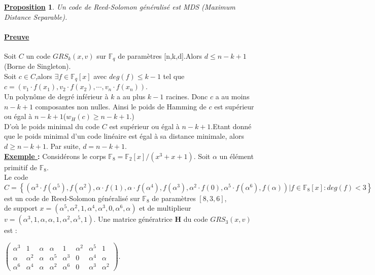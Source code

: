 \documentclass[12pt,openany]{report}
\newtheorem{proposition}{\underline{Proposition}}
\begin{document}
    \begin{proposition} Un code de Reed-Solomon généralisé est MDS (Maximum Distance Separable)\cite{Ndollane}. \end{proposition}
    \paragraph{\underline{Preuve}\\}
    Soit $\mathit{C} $ un code $GRS_k(x,v)$ sur $\mathbb{F}_q$ de paramètres [n,k,d].Alors $d\leq n-k+1$ (Borne de Singleton).\\
    Soit $c \in \mathit{C}$,alors $\exists f \in \mathbb{F}_q[x]$ avec $deg(f)\leq k-1 $ tel que $c=(v_1 \cdot f(x_1),v_2 \cdot f(x_2),\cdots,v_n \cdot f(x_n))$.\\
    Un polynôme de degré inférieur à $k$ a au plus $k-1$ racines. Donc $c$ a au moins $n-k+1$ composantes non nulles. Ainsi le poids de Hamming de $c$ est supérieur ou égal à $n-k+1$($ w_H(c)\geq n-k+1 $.)\\
    D'où le poids minimal du code $\mathit{C}$ est supérieur ou égal à $ n-k+1$.Etant donné que le poids minimal d'un code linéaire est égal à sa distance minimale, alors $ d \geq n-k+1$. Par suite,
    $ d = n-k+1$.\\
    \textbf{\underline{Exemple }:} Considérons le corps
    $\mathbb{F}_8=\mathbb{F}_2[x]/(x^3 + x+1)$. Soit $\alpha$ un élément primitif de $ \mathbb{F}_8$.\\
    Le code \\
    $\mathit{C}=\left\lbrace   \left( 
    \alpha^3 \cdot f(\alpha^5),f(\alpha^2),\alpha \cdot f(1),\alpha \cdot f(\alpha^4),f(\alpha^3),\alpha^2 \cdot f(0),\alpha^5 \cdot f(\alpha^6),f(\alpha) \right)| f \in \mathbb{F}_8[x]: deg(f)<3   \right\rbrace  $\\
    est un code de Reed-Solomon généralisé sur $\mathbb{F}_8$ de paramètres $[8,3,6] $, \\ de support $x=(\alpha^5,\alpha^2,1,\alpha^4,\alpha^3,0,\alpha^6,\alpha) $ et de multiplieur $v=(\alpha^3,1,\alpha,\alpha,1,\alpha^2,\alpha^5,1 ) $. Une matrice génératrice $\mathbf{H} $ du code $GRS_3(x,v)$ est :
    \begin{center}
    
    
    $\begin{pmatrix} 
         
         \alpha^3 &1&\alpha&\alpha&1&\alpha^2&\alpha^5&1\\
         \alpha&\alpha^2&\alpha&\alpha^5&\alpha^3&0&\alpha^4&\alpha\\
         \alpha^6&\alpha^4&\alpha&\alpha^2&\alpha^6&0&\alpha^3&\alpha^2
   \end{pmatrix}$.
   
   \end{center}
\end{document}
